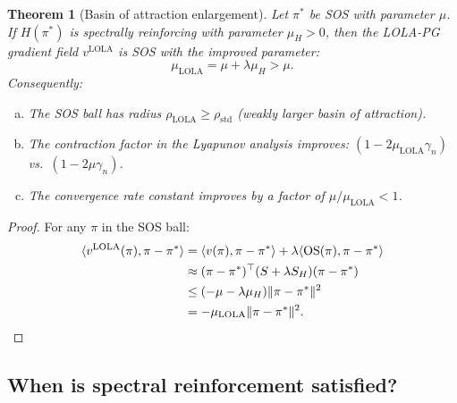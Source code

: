 \documentclass[11pt,a4paper]{article}
\newtheorem{theorem}{Theorem}[section]
\newcommand{\ip}[2]{\langle #1, #2 \rangle}
\begin{document}
\begin{theorem}[Basin of attraction enlargement]
\label{thm:basin}
Let $\pi^*$ be SOS with parameter $\mu$. If $H(\pi^*)$ is spectrally reinforcing with parameter $\mu_H > 0$, then the LOLA-PG gradient field $v^{\mathrm{LOLA}}$ is SOS with the improved parameter:
\begin{equation}
\label{eq:mu-lola}
\boxed{
    \mu_{\mathrm{LOLA}} = \mu + \lambda \mu_H > \mu.
}
\end{equation}
Consequently:
\begin{enumerate}[(a)]
    \item The SOS ball has radius $\rho_{\mathrm{LOLA}} \geq \rho_{\mathrm{std}}$ (weakly larger basin of attraction).
    \item The contraction factor in the Lyapunov analysis improves: $(1 - 2\mu_{\mathrm{LOLA}}\gamma_n)$ vs.\ $(1 - 2\mu\gamma_n)$.
    \item The convergence rate constant improves by a factor of $\mu/\mu_{\mathrm{LOLA}} < 1$.
\end{enumerate}
\end{theorem}

\begin{proof}
For any $\pi$ in the SOS ball:
\begin{align}
    \ip{v^{\mathrm{LOLA}}(\pi)}{\pi - \pi^*}
    &= \ip{v(\pi)}{\pi - \pi^*} + \lambda \ip{\mathrm{OS}(\pi)}{\pi - \pi^*} \notag\\
    &\approx (\pi - \pi^*)^\top (S + \lambda S_H)(\pi - \pi^*) \notag\\
    &\leq (-\mu - \lambda\mu_H)\|\pi - \pi^*\|^2 \notag\\
    &= -\mu_{\mathrm{LOLA}} \|\pi - \pi^*\|^2. \qedhere
\end{align}
\end{proof}

\subsection{When is spectral reinforcement satisfied?}
\end{document}
